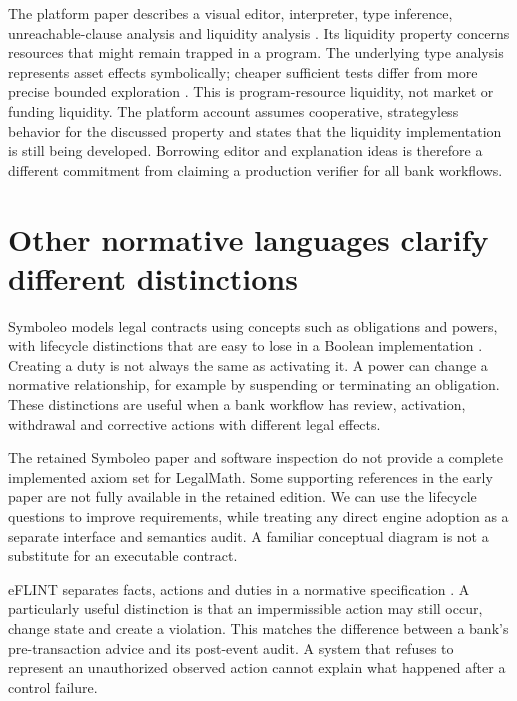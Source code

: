 \documentclass[12pt,a4paper,oneside,openany]{book}
\begin{document}
The platform paper describes a visual editor, interpreter, type inference,
unreachable-clause analysis and liquidity analysis
\citep[secs.~3--7]{stipulaplatform2026}. Its liquidity property concerns resources
that might remain trapped in a program. The underlying type analysis represents
asset effects symbolically; cheaper sufficient tests differ from more precise
bounded exploration \citep[secs.~4--5 and proof appendices]{liquidity2023}.
This is program-resource liquidity, not market or funding liquidity. The platform
account assumes cooperative, strategyless behavior for the discussed property
and states that the liquidity implementation is still being developed. Borrowing
editor and explanation ideas is therefore a different commitment from claiming
a production verifier for all bank workflows.

\section{Other normative languages clarify different distinctions}
\label{merge:M04:08}

\label{sec:languages-other}
Symboleo models legal contracts using concepts such as obligations and powers,
with lifecycle distinctions that are easy to lose in a Boolean implementation
\citep[secs.~II--IV]{symboleo2020}. Creating a duty is not always the same as
activating it. A power can change a normative relationship, for example by
suspending or terminating an obligation. These distinctions are useful when a
bank workflow has review, activation, withdrawal and corrective actions with
different legal effects.

The retained Symboleo paper and software inspection do not provide a complete
implemented axiom set for LegalMath. Some supporting references in the early
paper are not fully available in the retained edition. We can use the lifecycle
questions to improve requirements, while treating any direct engine adoption
as a separate interface and semantics audit. A familiar conceptual diagram is
not a substitute for an executable contract.

eFLINT separates facts, actions and duties in a normative specification
\citep[secs.~3--5]{eflint2020}. A particularly useful distinction is that an
impermissible action may still occur, change state and create a violation.
This matches the difference between a bank's pre-transaction advice and its
post-event audit. A system that refuses to represent an unauthorized observed
action cannot explain what happened after a control failure.
\end{document}
